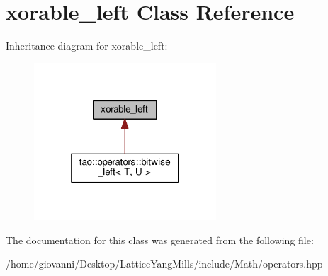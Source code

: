 \hypertarget{classxorable__left}{}\section{xorable\+\_\+left Class Reference}
\label{classxorable__left}


Inheritance diagram for xorable\+\_\+left\+:\nopagebreak
\begin{figure}[H]
\begin{center}
\leavevmode
\includegraphics[width=193pt]{classxorable__left__inherit__graph}
\end{center}
\end{figure}


The documentation for this class was generated from the following file\+:\begin{DoxyCompactItemize}
\item 
/home/giovanni/\+Desktop/\+Lattice\+Yang\+Mills/include/\+Math/operators.\+hpp\end{DoxyCompactItemize}
